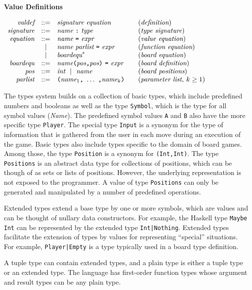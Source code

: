 \documentclass[11pt]{article}
\makeatletter
\newcommand{\prodName}[1]{&(\emph{#1})\\}
\newcommand{\nt}[1]{\textit{#1}}
\newcommand{\prog}[1]{\texttt{#1}}
\newcommand{\ORil}{\ \ |\ \ }
\newcommand{\IS}{&::=&}
\newcommand{\OR}{&|&}
\newcommand{\syntax}[2]{
  \needspace{3\baselineskip}
  \bigskip\par\noindent\textbf{#1}\par\smallskip%
  $\begin{array}{rcl@{\qquad}l}#2\end{array}$%
  \par\bigskip\noindent\ignorespaces
}
\newcommand{\lp}{\prog{(}}
\newcommand{\rp}{\prog{)}}
\newcommand{\paren}[1]{\lp#1\rp}
\newcommand{\pair}[2]{\paren{#1\prog{,}#2}}
\makeatother
\begin{document}
\syntax{Value Definitions}{
\nt{valdef}    \IS \nt{signature}\ \nt{equation}   \prodName{definition}
\nt{signature} \IS \nt{name}\ \prog{:}\ \nt{type}  \prodName{type signature}
\nt{equation}  \IS \nt{name}\ \prog{=}\ \nt{expr}  \prodName{value equation}
               \OR \nt{name}\ \nt{parlist}\ \prog{=}\ \nt{expr}
                   \prodName{function equation}
               \OR \nt{boardequ}^*                  \prodName{board equation}
\nt{boardequ}  \IS \nt{name}\pair{\nt{pos}}{\nt{pos}}\ \prog{=}\ \nt{expr}
                   \prodName{board definition}
\nt{pos}       \IS \nt{int} \ORil \nt{name}      \prodName{board positions}
\nt{parlist} \IS \paren{\nt{name}_1\prog{,}\ \ldots\ \prog{,}\nt{name}_k}
                 \prodName{parameter list, $k\geq 1$}
}
%
The types system builds on a collection of basic types, which include
predefined numbers and booleans as well as the type \prog{Symbol}, which is the
type for all symbol values (\nt{Name}). The predefined symbol values \prog{A}
and \prog{B} also have the more specific type \prog{Player}. The special type
\prog{Input} is a synonym for the type of information that is gathered from the
user in each move during an execution of the game.
%
Basic types also include types specific to the domain of board games. Among
those, the type \prog{Position} is a synonym for \prog{(Int,Int)}. The type
\prog{Positions} is an abstract data type for collections of positions, which
can be though of as sets or lists of positions. However, the underlying
representation is not exposed to the programmer. A value of type
\prog{Positions} can only be generated and manipulated by a number of
predefined operations.

Extended types extend a base type by one or more symbols, which are values and
can be thought of nullary data constructors. For example, the Haskell type
\prog{Maybe Int} can be represented by the extended type \prog{Int|Nothing}.
Extended types facilitate the extension of types by values for representing
``special'' situations. For example, \prog{Player|Empty} is a type typically
used in a board type definition.

A tuple type can contain extended types, and a plain type is either a tuple
type or an extended type. The language has first-order function types whose
argument and result types can be any plain type.
\end{document}
